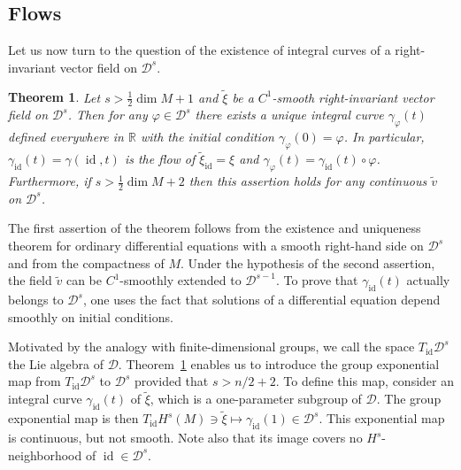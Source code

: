 \documentclass[a5paper,10pt,twoside]{article}
\newcommand{\R}{\ensuremath{\mathbb{R}}}
\newcommand{\cD}{\ensuremath{\mathcal{D}}}
\DeclareMathOperator*{\id}{id}
\theoremstyle{plain}
\newtheorem{teo}{Theorem}[section]
\theoremstyle{definition}
\theoremstyle{remark}
\begin{document}
\subsection{Flows}
Let us now turn to the question of the existence of integral curves of a
right-invariant vector field on $\cD^s$.

\begin{teo}
\label{teo:ODE-existence}
Let $s>\frac{1}{2}\dim M +1$ and $\tilde{\xi}$ be a $C^1$-smooth right-invariant vector field on $\cD^s$. Then for any $\varphi\in\cD^s$ there exists a unique integral curve $\gamma_\varphi(t)$ defined everywhere in $\R$ with the initial condition $\gamma_\varphi(0)=\varphi$. In particular, $\gamma_{\id}(t)=\gamma(\id,t)$ is the flow of $\tilde{\xi}_{\id}=\xi$ and $\gamma_{\varphi}(t)=\gamma_{\id}(t)\circ\varphi$.
Furthermore, if $s>\frac{1}{2}\dim M +2$ then this assertion holds for any continuous $\tilde{v}$ on $\cD^s$.
\end{teo}

The first assertion of the theorem follows from the existence and uniqueness
theorem for ordinary differential equations with a smooth right-hand side
on $\cD^s$ and from the compactness of $M$. Under the hypothesis of the second
assertion, the field $\tilde{v}$ can be $C^1$-smoothly extended to $\cD^{s-1}$. To prove
that $\gamma_{\id}(t)$ actually belongs to $\cD^s$, one uses the fact that solutions of a
differential equation depend smoothly on initial conditions.

Motivated by the analogy with finite-dimensional groups, we call the space
$T_{\id}\cD^s$ the Lie algebra of $\cD$.
Theorem~\ref{teo:ODE-existence} enables us to introduce the group exponential map from
$T_{\id}\cD^s$ to $\cD^s$ provided that $s > n/2 + 2$. To define this map, consider
an integral curve $\gamma_{\id}(t)$ of $\tilde{\xi}$, which  is a one-parameter subgroup
of $\cD$. The group exponential map is then $T_{\id}H^s(M)\ni \tilde{\xi}\mapsto \gamma_{\id}(1)\in\cD^s$. This exponential map is continuous, but not smooth. Note
also that its image covers no $H^s$-neighborhood of $\id\in\cD^s$.
\end{document}
